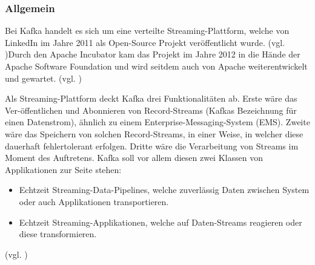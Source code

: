 \subsubsection{Allgemein}
Bei Kafka handelt es sich um eine verteilte Streaming-Plattform, welche von LinkedIn im Jahre 2011 als Open-Source Projekt veröffentlicht wurde. 
(vgl. \cite{Kafka-Open-Sourcing})Durch den Apache Incubator kam das Projekt im Jahre 2012 in die Hände der Apache Software Foundation und wird seitdem auch von Apache weiterentwickelt und gewartet.
(vgl. \cite{Kafka-Apache-Incubator})
\vspace{5mm}\par
Als Streaming-Plattform deckt Kafka drei Funktionalitäten ab.
Erste wäre das Ver-öffentlichen und Abonnieren von Record-Streams (Kafkas Bezeichnung für einen Datenstrom), ähnlich zu einem Enterprise-Messaging-System (EMS). Zweite wäre das Speichern von solchen Record-Streams, in einer Weise, in welcher diese dauerhaft fehlertolerant erfolgen. Dritte wäre die Verarbeitung von Streams im Moment des Auftretens.
\vspace{5mm}
Kafka soll vor allem diesen zwei Klassen von Applikationen zur Seite stehen:
\begin{itemize}
    \item Echtzeit Streaming-Data-Pipelines, welche zuverlässig Daten zwischen System oder auch Applikationen transportieren.
    \item Echtzeit Streaming-Applikationen, welche auf Daten-Streams reagieren oder diese transformieren.
\end{itemize}
(vgl. \cite{Kafka-Introduction})

